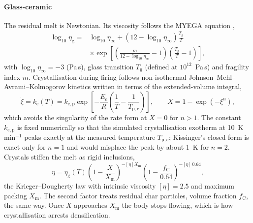 \paragraph{Glass-ceramic} The residual melt is Newtonian. Its viscosity follows the MYEGA equation \cite{mauro2009viscosity},
\begin{equation}
\begin{split}
\log_{10}\eta_{\mathrm{g}} ={}& \log_{10}\eta_\infty + \left(12-\log_{10}\eta_\infty\right)\frac{T_{\mathrm{g}}}{T}\\
&\times\exp\!\left[\left(\frac{m}{12-\log_{10}\eta_\infty}-1\right)\left(\frac{T_{\mathrm{g}}}{T}-1\right)\right],
\end{split}
\label{eq:myega}
\end{equation}
with $\log_{10}\eta_\infty = -3$ (Pa\,s), glass transition $T_{\mathrm{g}}$ (defined at $10^{12}$~Pa\,s) and fragility index $m$. Crystallisation during firing follows non-isothermal Johnson--Mehl--Avrami--Kolmogorov kinetics \cite{avrami1939kinetics} written in terms of the extended-volume integral,
\begin{equation}
\dot{\xi} = k_{\mathrm{c}}(T) = k_{\mathrm{c,p}}\exp\!\left[-\frac{E_{\mathrm{c}}}{R}\left(\frac{1}{T}-\frac{1}{T_{\mathrm{p,c}}}\right)\right],\qquad X = 1-\exp\left(-\xi^{n}\right),
\label{eq:jmak}
\end{equation}
which avoids the singularity of the rate form at $X = 0$ for $n > 1$. The constant $k_{\mathrm{c,p}}$ is fixed numerically so that the simulated crystallisation exotherm at 10~K\,min$^{-1}$ peaks exactly at the measured temperature $T_{\mathrm{p,c}}$; Kissinger's closed form \cite{kissinger1957reaction} is exact only for $n = 1$ and would misplace the peak by about 1~K for $n = 2$. Crystals stiffen the melt as rigid inclusions,
\begin{equation}
\eta = \eta_{\mathrm{g}}(T)\left(1-\frac{X}{X_{\mathrm{m}}}\right)^{-[\eta]X_{\mathrm{m}}}\left(1-\frac{f_{\mathrm{C}}}{0.64}\right)^{-[\eta]\,0.64},
\label{eq:kd}
\end{equation}
the Krieger--Dougherty law \cite{krieger1959mechanism} with intrinsic viscosity $[\eta] = 2.5$ and maximum packing $X_{\mathrm{m}}$. The second factor treats residual char particles, volume fraction $f_{\mathrm{C}}$, the same way. Once $X$ approaches $X_{\mathrm{m}}$ the body stops flowing, which is how crystallisation arrests densification.

